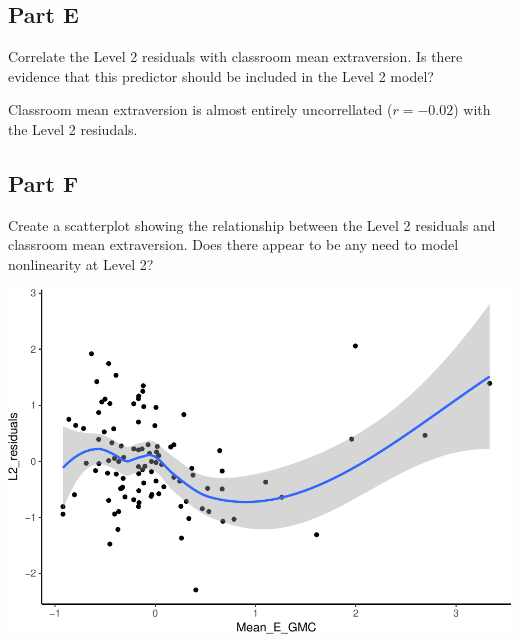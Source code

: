 \documentclass[]{article}
\newenvironment{Shaded}{\begin{snugshade}}{\end{snugshade}}
\newcommand{\KeywordTok}[1]{\textcolor[rgb]{0.13,0.29,0.53}{\textbf{#1}}}
\newcommand{\DataTypeTok}[1]{\textcolor[rgb]{0.13,0.29,0.53}{#1}}
\newcommand{\StringTok}[1]{\textcolor[rgb]{0.31,0.60,0.02}{#1}}
\newcommand{\OperatorTok}[1]{\textcolor[rgb]{0.81,0.36,0.00}{\textbf{#1}}}
\newcommand{\NormalTok}[1]{#1}
\begin{document}
\subsection{Part E}\label{part-e}

Correlate the Level 2 residuals with classroom mean extraversion. Is
there evidence that this predictor should be included in the Level 2
model?

\begin{Shaded}
\end{Shaded}

Classroom mean extraversion is almost entirely uncorrellated
(\(r = -0.02\)) with the Level 2 resiudals.

\subsection{Part F}\label{part-f}

Create a scatterplot showing the relationship between the Level 2
residuals and classroom mean extraversion. Does there appear to be any
need to model nonlinearity at Level 2?

\begin{Shaded}
\end{Shaded}

\includegraphics{Beck_HW_5_R_1_files/figure-latex/unnamed-chunk-12-1.pdf}
\end{document}
